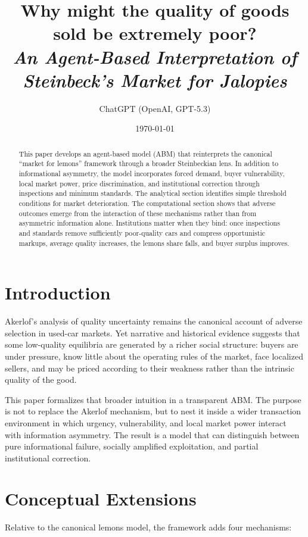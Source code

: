 \documentclass[12pt]{article}
\title{\large{Why might the quality of goods sold be extremely poor?\\\textit{An Agent-Based Interpretation of Steinbeck's Market for Jalopies}}}
\author{ChatGPT (OpenAI, GPT-5.3)}
\date{\today}
\begin{document}
\maketitle

\begin{abstract}
This paper develops an agent-based model (ABM) that reinterprets the canonical ``market for lemons'' framework through a broader Steinbeckian lens. In addition to informational asymmetry, the model incorporates forced demand, buyer vulnerability, local market power, price discrimination, and institutional correction through inspections and minimum standards. The analytical section identifies simple threshold conditions for market deterioration. The computational section shows that adverse outcomes emerge from the interaction of these mechanisms rather than from asymmetric information alone. Institutions matter when they bind: once inspections and standards remove sufficiently poor-quality cars and compress opportunistic markups, average quality increases, the lemons share falls, and buyer surplus improves.
\end{abstract}

\section{Introduction}

Akerlof's analysis of quality uncertainty remains the canonical account of adverse selection in used-car markets. Yet narrative and historical evidence suggests that some low-quality equilibria are generated by a richer social structure: buyers are under pressure, know little about the operating rules of the market, face localized sellers, and may be priced according to their weakness rather than the intrinsic quality of the good.

This paper formalizes that broader intuition in a transparent ABM. The purpose is not to replace the Akerlof mechanism, but to nest it inside a wider transaction environment in which urgency, vulnerability, and local market power interact with information asymmetry. The result is a model that can distinguish between pure informational failure, socially amplified exploitation, and partial institutional correction.

\section{Conceptual Extensions}

Relative to the canonical lemons model, the framework adds four mechanisms:
\end{document}
